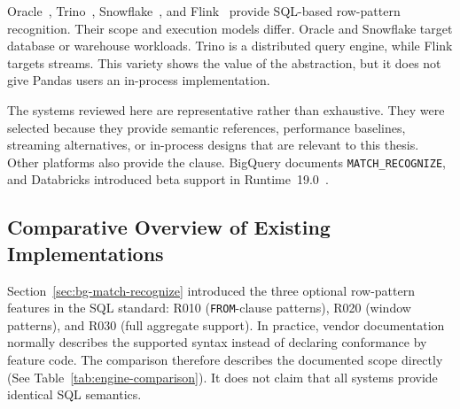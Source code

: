 Oracle~\cite{OracleMR,oracle2021dwhsg,book},
Trino~\cite{trino2022,trino2021row},
Snowflake~\cite{snowflake2025match_recognize}, and
Flink~\cite{flink} provide SQL-based row-pattern recognition.
Their scope and execution models differ.  Oracle and Snowflake target
database or warehouse workloads.  Trino is a distributed query
engine, while Flink targets streams.  This variety shows the value of
the abstraction, but it does not give Pandas users an in-process
implementation.

The systems reviewed here are representative rather than exhaustive.
They were selected because they provide semantic references,
performance baselines, streaming alternatives, or in-process designs
that are relevant to this thesis.  Other platforms also provide the
clause.  BigQuery documents \texttt{MATCH\_RECOGNIZE}, and Databricks
introduced beta support in Runtime~19.0~\cite{bigquery2025matchrecognize,
databricks2026matchrecognize}.

\subsection{Comparative Overview of Existing Implementations}
\label{subsec:related-existing-overview}

Section~\ref{sec:bg-match-recognize} introduced the three optional
row-pattern features in the SQL standard: R010 (\texttt{FROM}-clause
patterns), R020 (window patterns), and R030 (full aggregate
support).
In practice, vendor documentation normally
describes the supported syntax instead of declaring conformance by
feature code.  The comparison therefore describes the documented scope
directly (See Table~\ref{tab:engine-comparison}).  It does not claim that
all systems
provide identical SQL semantics.


